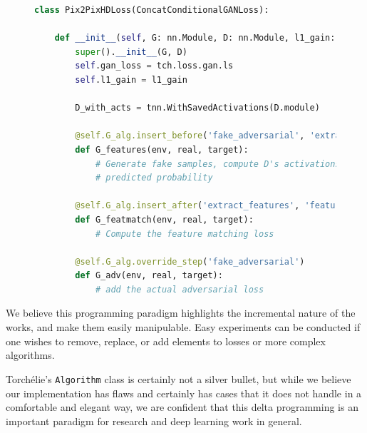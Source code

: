 \begin{figure}
\begin{lstlisting}[language=Python, label=code:pix2pixhd, caption=Pix2PixHD]
class Pix2PixHDLoss(ConcatConditionalGANLoss):

    def __init__(self, G: nn.Module, D: nn.Module, l1_gain: float):
        super().__init__(G, D)
        self.gan_loss = tch.loss.gan.ls
        self.l1_gain = l1_gain

        D_with_acts = tnn.WithSavedActivations(D.module)

        @self.G_alg.insert_before('fake_adversarial', 'extract_features')
        def G_features(env, real, target):
            # Generate fake samples, compute D's activations and its final
            # predicted probability

        @self.G_alg.insert_after('extract_features', 'feature_matching')
        def G_featmatch(env, real, target):
            # Compute the feature matching loss

        @self.G_alg.override_step('fake_adversarial')
        def G_adv(env, real, target):
            # add the actual adversarial loss
\end{lstlisting}
\end{figure}

We believe this programming paradigm highlights the incremental nature of the works, and make them easily manipulable. Easy experiments can be conducted if one wishes to remove, replace, or add elements to losses or more complex algorithms.

Torchélie's \texttt{Algorithm} class is certainly not a silver bullet, but while we believe our implementation has flaws and certainly has cases that it does not handle in a comfortable and elegant way, we are confident that this delta programming is an important paradigm for research and deep learning work in general.


